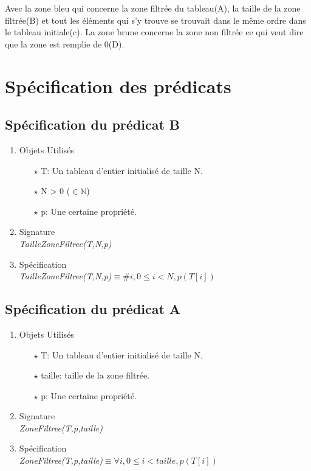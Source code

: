 \documentclass[a4paper, 11pt, oneside]{article}
\begin{document}
Avec la zone {\color[HTML]{3531FF}bleu} qui concerne la zone filtrée du tableau(A), la taille de la zone filtrée(B) et tout les éléments qui s'y trouve se trouvait dans le même ordre dans le tableau initiale(c). La zone {\color[HTML]{9A0000} brune} concerne la zone non filtrée ce qui veut dire que la zone est remplie de 0(D).

\section{Spécification des prédicats}

    \subsection{Spécification du prédicat B}

    \begin{enumerate}
        \item Objets Utilisés
            \begin{itemize}
                \item[$\star$] T: Un tableau d'entier initialisé de taille N.
                \item[$\star$] N > 0 ($\in \mathbb{N}$)
                \item[$\star$] p: Une certaine propriété. 
            \end{itemize}

        \item Signature \\
            \textit{TailleZoneFiltree(T,N,p)}

        \item Spécification\\
            \textit{TailleZoneFiltree(T,N,p)}$\equiv \# i, 0\leq i < N, p(T[i])$
    \end{enumerate}

    \subsection{Spécification du prédicat A}

    \begin{enumerate}
        \item Objets Utilisés
            \begin{itemize}
                \item[$\star$] T: Un tableau d'entier initialisé de taille N.
                \item[$\star$] taille: taille de la zone filtrée.
                \item[$\star$] p: Une certaine propriété. 
            \end{itemize}

        \item Signature \\
            \textit{ZoneFiltree(T,p,taille)}

        \item Spécification\\
            \textit{ZoneFiltree(T,p,taille)}$\equiv \forall i, 0\leq i < taille, p(T[i])$
    \end{enumerate}
\end{document}
